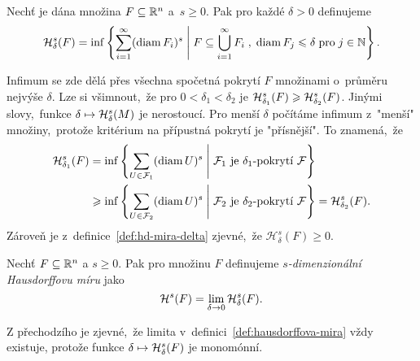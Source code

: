 \begin{definition}\label{def:hd-mira-delta}
    Nechť je dána množina $F\subseteq\R^n$ a~$s\geqslant 0$. Pak pro každé $\delta>0$ definujeme
    \[\hausdorffdeltameasure{s}{\delta}(F)=\inf\set{\sum_{i=1}^{\infty}(\diam{F_i})^s\;\middle|\;F\subseteq\bigcup_{i=1}^\infty F_i\;,\;\diam{F_j}\leqslant\delta\;\text{pro}\;j\in\N}.\]
\end{definition}
Infimum se zde dělá přes všechna spočetná pokrytí $F$ množinami o~průměru nejvýše $\delta$. Lze si všimnout,~že pro $0<\delta_1<\delta_2$ je $\hausdorffdeltameasure{s}{\delta_1}(F)\geqslant\hausdorffdeltameasure{s}{\delta_2}(F)$. Jinými slovy,~funkce $\delta\mapsto\hausdorffdeltameasure{s}{\delta}(M)$ je nerostoucí. Pro menší $\delta$ počítáme infimum z~"menší" množiny,~protože kritérium na přípustná pokrytí je "přísnější". To znamená,~že
\begin{align*}
    \hausdorffdeltameasure{s}{\delta_1}(F)&=\inf\set{\sum_{U\in\mathcal{F}_1}(\diam{U})^s\;\middle|\;\text{$\mathcal{F}_1$ je $\delta_1$-pokrytí $\mathcal{F}$}}\\
    &\geqslant\inf\set{\sum_{U\in\mathcal{F}_2}(\diam{U})^s\;\middle|\;\text{$\mathcal{F}_2$ je $\delta_2$-pokrytí $\mathcal{F}$}}=\hausdorffdeltameasure{s}{\delta_2}(F).
\end{align*}
Zároveň je z~definice~\ref{def:hd-mira-delta} zjevné,~že $\mathcal{H}_\delta^s(F)\geqslant 0$.
\begin{definition}\label{def:hausdorffova-mira}
    Nechť $F\subseteq\R^n$ a $s\geqslant 0$. Pak pro množinu $F$ definujeme \emph{$s$-dimenzionální Hausdorffovu míru} jako
    \[\hausdorffmeasure{s}(F)=\lim_{\delta\to 0}\hausdorffdeltameasure{s}{\delta}(F).\]
\end{definition}
Z přechodzího je zjevné,~že limita v~definici~\ref{def:hausdorffova-mira} vždy existuje, protože funkce $\delta\mapsto\hausdorffdeltameasure{s}{\delta}(F)$ je monomónní.

